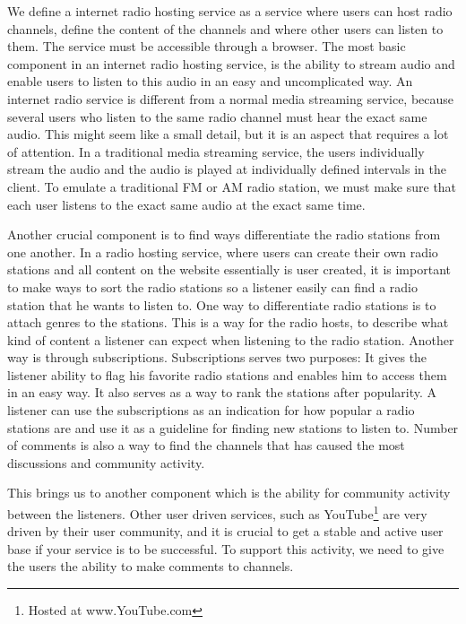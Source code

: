 \documentclass[a4paper,11pt,report]{article}
\begin{document}
We define a internet radio hosting service as a service where users can host radio channels, define the content of the channels and where other users can listen to them. The service must be accessible through a browser. The most basic component in an internet radio hosting service, is the ability to stream audio and enable users to listen to this audio in an easy and uncomplicated way. An internet radio service is different from a normal media streaming service, because several users who listen to the same radio channel must hear the exact same audio. This might seem like a small detail, but it is an aspect that requires a lot of attention. In a traditional media streaming service, the users individually stream the audio and the audio is played at individually defined intervals in the client. To emulate a traditional FM or AM radio station, we must make sure that each user listens to the exact same audio at the exact same time. 

Another crucial component is to find ways differentiate the radio stations from one another. In a radio hosting service, where users can create their own radio stations and all content on the website essentially is user created, it is important to make ways to sort the radio stations so a listener easily can find a radio station that he wants to listen to. One way to differentiate radio stations is to attach genres to the stations. This is a way for the radio hosts, to describe what kind of content a listener can expect when listening to the radio station. Another way is through subscriptions. Subscriptions serves two purposes: It gives the listener ability to flag his favorite radio stations and enables him to access them in an easy way. It also serves as a way to rank the stations after popularity. A listener can use the subscriptions as an indication for how popular a radio stations are and use it as a guideline for finding new stations to listen to. Number of comments is also a way to find the channels that has caused the most discussions and community activity. 

This brings us to another component which is the ability for community activity between the listeners. Other user driven services, such as YouTube\footnote{Hosted at www.YouTube.com} are very driven by their user community, and it is crucial to get a stable and active user base if your service is to be successful. To support this activity, we need to give the users the ability to make comments to channels.
\end{document}
